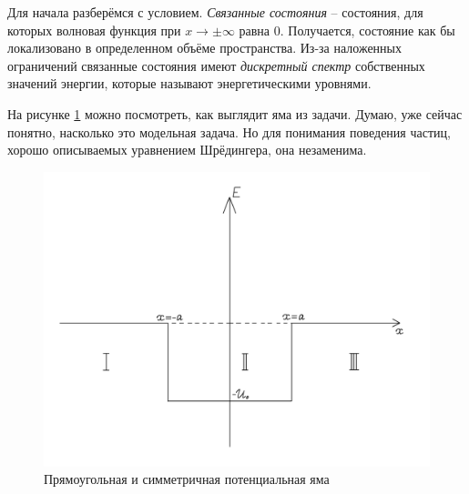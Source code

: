 Для начала разберёмся с условием. \textit{Связанные состояния} – состояния, для которых волновая функция при $x \rightarrow \pm \infty$ равна $0$. Получается, состояние как бы локализовано в определенном объёме пространства. Из-за наложенных ограничений связанные состояния имеют \textit{дискретный спектр} собственных значений энергии, которые называют энергетическими уровнями.

На рисунке \ref{fig 3.1} можно посмотреть, как выглядит яма из задачи. Думаю, уже сейчас понятно, насколько это модельная задача. Но для понимания поведения частиц, хорошо описываемых уравнением Шрёдингера, она незаменима.
\begin{figure}[!ht]
\centering
\includegraphics[scale=0.27]{class_3/images/hole.png}
\caption{Прямоугольная и симметричная потенциальная яма}
\label{fig 3.1}
\end{figure}

